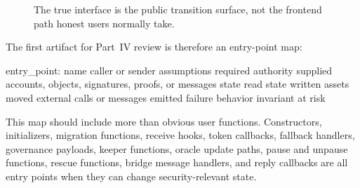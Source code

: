 \begin{figure}[htbp]
\centering
{}
\caption{The true interface is the public transition surface, not the frontend path honest users normally take.}
\end{figure}

The first artifact for Part~IV review is therefore an entry-point map:

\begin{codeblock}
entry_point:
    name
    caller or sender assumptions
    required authority
    supplied accounts, objects, signatures, proofs, or messages
    state read
    state written
    assets moved
    external calls or messages emitted
    failure behavior
    invariant at risk
\end{codeblock}

This map should include more than obvious user functions. Constructors, initializers, migration functions, receive hooks, token callbacks, fallback handlers, governance payloads, keeper functions, oracle update paths, pause and unpause functions, rescue functions, bridge message handlers, and reply callbacks are all entry points when they can change security-relevant state.

